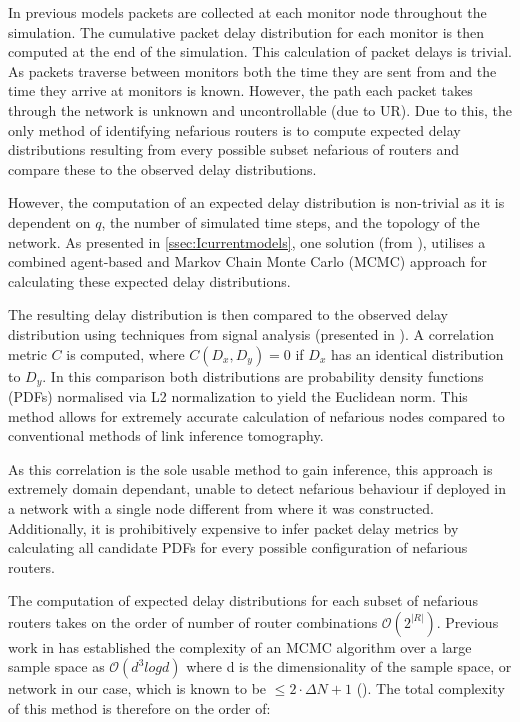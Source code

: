 In previous models packets are collected at each monitor node throughout the simulation. The cumulative packet delay distribution for each monitor is then computed at the end of the simulation. This calculation of packet delays is trivial. As packets traverse between monitors both the time they are sent from and the time they arrive at monitors is known. However, the path each packet takes through the network is unknown and uncontrollable (due to UR). Due to this, the only method of identifying nefarious routers is to compute expected delay distributions resulting from every possible subset nefarious of routers and compare these to the observed delay distributions.\par
However, the computation of an expected delay distribution is non-trivial as it is dependent on $q$, the number of simulated time steps, and the topology of the network. As presented in \cref{ssec:Icurrentmodels}, one solution (from \cite{barnes_stochastic_2020}), utilises a combined agent-based and Markov Chain Monte Carlo (MCMC) approach for calculating these expected delay distributions.\par
The resulting delay distribution is then compared to the observed delay distribution using techniques from signal analysis (presented in \cite{lynn_introduction_2016}). A correlation metric $C$ is computed, where $C(D_x,D_y)=0$ if $D_x$ has an identical distribution to $D_y$. In this comparison both distributions are probability density functions (PDFs) normalised via L2 normalization to yield the Euclidean norm. This method allows for extremely accurate calculation of nefarious nodes compared to conventional methods of link inference tomography.\par
As this correlation is the sole usable method to gain inference, this approach is extremely domain dependant, unable to detect nefarious behaviour if deployed in a network with a single node different from where it was constructed. Additionally, it is prohibitively expensive to infer packet delay metrics by calculating all candidate PDFs for every possible configuration of nefarious routers.\par
The computation of expected delay distributions for each subset of nefarious routers takes on the order of number of router combinations $\mathcal{O}(2^{|R|})$. Previous work in \cite{belloni_computational_2009} has established the complexity of an MCMC algorithm over a large sample space as $\mathcal{O}(d^3 log d)$ where d is the dimensionality of the sample space, or network in our case, which is known to be $\leq 2\cdot \Delta N + 1$ (\cite{erdos_chromatic_1980}). The total complexity of this method is therefore on the order of:
